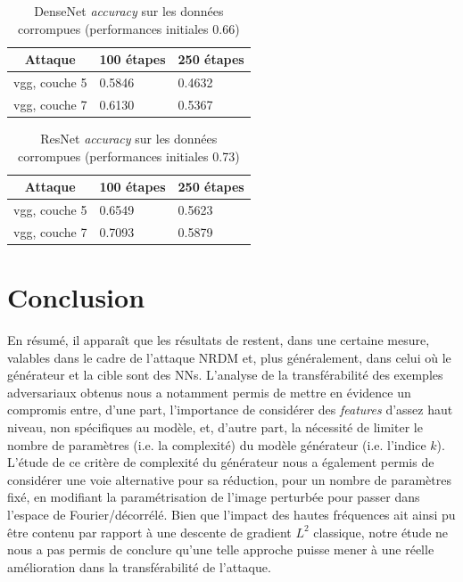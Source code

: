 \documentclass{article}
\begin{document}
\begin{table}[!h]
\centering
\caption{DenseNet \textit{accuracy} sur les données corrompues (performances initiales 0.66)}
\label{tab:DenseNet_accuracy_fft_dec}
\begin{tabular}{|c|l|l|}
\hline
Attaque      & \multicolumn{1}{c|}{100 étapes} & \multicolumn{1}{c|}{250 étapes}  \\ \hline
vgg, couche 5 & 0.5846                      & 0.4632                    \\ \hline
vgg, couche 7& 0.6130                   & 0.5367                   \\ \hline
\end{tabular}
\end{table}

\begin{table}[!h]
\centering
\caption{ResNet \textit{accuracy} sur les données corrompues (performances initiales 0.73)}
\label{tab:ResNet_accuracy_fft_dec}
\begin{tabular}{|c|l|l|}
\hline
Attaque      & \multicolumn{1}{c|}{100 étapes} & \multicolumn{1}{c|}{250 étapes}  \\ \hline
vgg, couche 5 & 0.6549                      & 0.5623                    \\ \hline
vgg, couche 7& 0.7093                   & 0.5879                   \\ \hline
\end{tabular}
\end{table}

\section*{Conclusion}

En résumé, il apparaît que les résultats de \citet{Demontis2018WhyDA} restent, dans une certaine mesure, valables dans le cadre de l'attaque NRDM et, plus généralement, dans celui où le générateur et la cible sont des NNs. L'analyse de la transférabilité des exemples adversariaux obtenus nous a notamment permis de mettre en évidence un compromis entre, d'une part, l'importance de considérer des \textit{features} d'assez haut niveau, non spécifiques au modèle, et, d'autre part, la nécessité de limiter le nombre de paramètres (i.e. la complexité) du modèle générateur (i.e. l'indice $k$).\\
L'étude de ce critère de complexité du générateur nous a également permis de considérer une voie alternative pour sa réduction, pour un nombre de paramètres fixé, en modifiant la paramétrisation de l'image perturbée pour passer dans l'espace de Fourier/décorrélé. Bien que l'impact des hautes fréquences ait ainsi pu être contenu par rapport à une descente de gradient $L^2$ classique, notre étude ne nous a pas permis de conclure qu'une telle approche puisse mener à une réelle amélioration dans la transférabilité de l'attaque.\\
\end{document}
